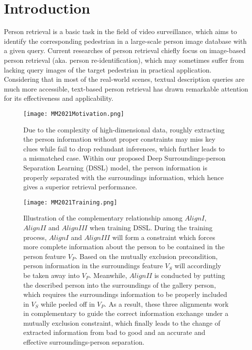 \documentclass[sigconf]{acmart}
\begin{document}
\maketitle

\section{Introduction}

Person retrieval is a basic task in the field of video surveillance, which aims to identify the corresponding pedestrian in a large-scale person image database with a given query. Current researches of person retrieval chiefly focus on image-based person retrieval \cite{yi2014deepreid, IAM2019CVPR, SecondOrder2019} (aka. person re-identification), which may sometimes suffer from lacking query images of the target pedestrian in practical application. Considering that in most of the real-world scenes, textual description queries are much more accessible, text-based person retrieval \cite{Shuang2017Person, li2017identity, niu2020improving, Jing2018Pose, ARL, wang2020img, mm2019graphreid} has drawn remarkable attention for its effectiveness and applicability.

\begin{figure}[h]
	\centering
	\texttt{[image: MM2021Motivation.png]}
	\caption{Due to the complexity of high-dimensional data, roughly extracting the person information without proper constraints may miss key clues while fail to drop redundant inferences, which further leads to a mismatched case. Within our proposed Deep Surroundings-person Separation Learning (DSSL) model, the person information is properly separated with the surroundings information, which hence gives a superior retrieval performance.}
	\label{fig:motivation}
\end{figure}

\begin{figure*}[h]
	\centering
	\texttt{[image: MM2021Training.png]}
	\caption{Illustration of the complementary relationship among $Align I$, $Align II$ and $Align III$ when training DSSL. During the training process, $Align I$ and $Align III$ will form a constraint which forces more complete information about the person to be contained in the person feature $V_{P}$. Based on the mutually exclusion precondition, person information in the surroundings feature $V_{S}$ will accordingly be taken away into $V_{P}$. Meanwhile, $Align II$ is conducted by putting the described person into the surroundings of the gallery person, which requires the surroundings information to be properly included in $V_{S}$ while peeled off in $V_{P}$. As a result, these three alignments work in complementary to guide the correct information exchange under a mutually exclusion constraint, which finally leads to the change of extracted information from bad to good and an accurate and effective surroundings-person separation.}
	\label{fig:training}
\end{figure*}
\end{document}
